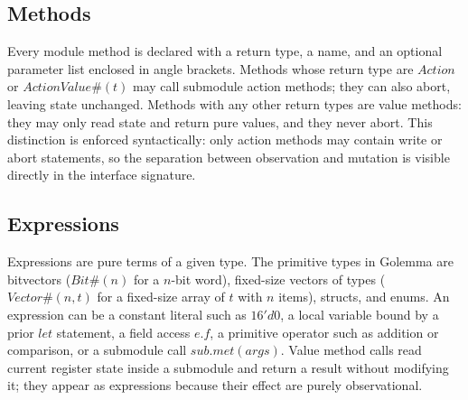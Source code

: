 \documentclass[fontset=fira-newtxsf]{mitthesis}
\theoremstyle{definition}
\theoremstyle{plain}
\begin{document}
\subsection{Methods}
Every module method is declared with a return type, a name, and an optional parameter list enclosed in angle brackets.
Methods whose return type are $\mathit{Action}$ or $\mathit{ActionValue}\#(t)$ may call submodule action methods; they can also abort, leaving state unchanged.
Methods with any other return types are value methods: they may only read state and return pure values, and they never abort.
This distinction is enforced syntactically: only action methods may contain write or abort statements, so the separation between observation and mutation is visible directly in the interface signature.

\subsection{Expressions}
Expressions are pure terms of a given type.
The primitive types in Golemma are bitvectors ($\mathit{Bit\#(n)}$ for a $n$-bit word), fixed-size vectors of types ($\mathit{Vector\#(n,t)}$ for a fixed-size array of $t$ with $n$ items), structs, and enums.
An expression can be a constant literal such as $16'd0$, a local variable bound by a prior $\mathit{let}$ statement, a field access $\mathit{e}.\mathit{f}$, a primitive operator such as addition or comparison, or a submodule call $\mathit{sub}.\mathit{met}(\mathit{args})$.
Value method calls read current register state inside a submodule and return a result without modifying it; they appear as expressions because their effect are purely observational.
\end{document}
